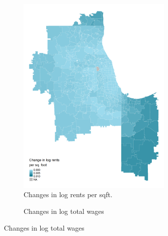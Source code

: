 \documentclass[aspectratio=169, t]{beamer}
\begin{document}
\begin{frame}[label = changes_rents_inc]
    \vspace{-3.5mm}

    \begin{figure}
        \begin{subfigure}{0.5\textwidth}
            \caption*{Changes in log rents per sqft.}
            \includegraphics[width = 0.83\textwidth]{counterfactuals/output/chicago_d_ln_rents.png}
        \end{subfigure}%
        \begin{subfigure}{0.5\textwidth}
            \caption*{Changes in log total wages}

\end{subfigure}
\end{figure}
\end{frame}
\end{document}
